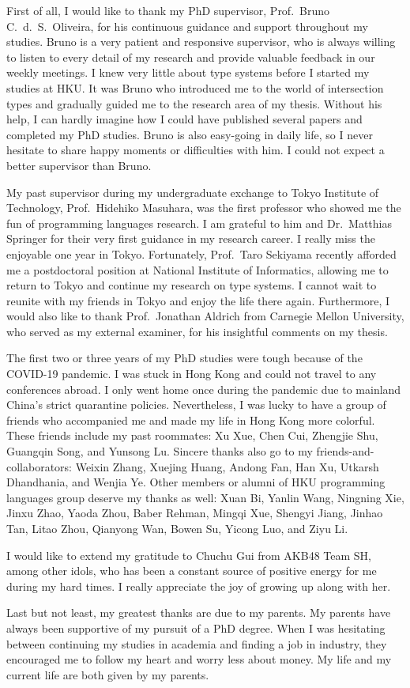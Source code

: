 First of all, I would like to thank my PhD supervisor, Prof.\ Bruno C.\ d.\ S.\
Oliveira, for his continuous guidance and support throughout my studies. Bruno
is a very patient and responsive supervisor, who is always willing to listen to
every detail of my research and provide valuable feedback in our weekly
meetings. I knew very little about type systems before I started my studies at
HKU. It was Bruno who introduced me to the world of intersection types and
gradually guided me to the research area of my thesis. Without his help, I can
hardly imagine how I could have published several papers and completed my PhD
studies. Bruno is also easy-going in daily life, so I never hesitate to share
happy moments or difficulties with him. I could not expect a better supervisor
than Bruno.

My past supervisor during my undergraduate exchange to Tokyo Institute of
Technology, Prof.\ Hidehiko Masuhara, was the first professor who showed me the
fun of programming languages research. I am grateful to him and Dr.\ Matthias
Springer for their very first guidance in my research career. I really miss the
enjoyable one year in Tokyo. Fortunately, Prof.\ Taro Sekiyama recently afforded
me a postdoctoral position at National Institute of Informatics, allowing me to
return to Tokyo and continue my research on type systems. I cannot wait to
reunite with my friends in Tokyo and enjoy the life there again. Furthermore, I
would also like to thank Prof.\ Jonathan Aldrich from Carnegie Mellon University,
who served as my external examiner, for his insightful comments on my thesis.

The first two or three years of my PhD studies were tough because of the COVID-19
pandemic. I was stuck in Hong Kong and could not travel to any conferences
abroad. I only went home once during the pandemic due to mainland China's
strict quarantine policies. Nevertheless, I was lucky to have a group of friends
who accompanied me and made my life in Hong Kong more colorful. These friends
include my past roommates: Xu Xue, Chen Cui, Zhengjie Shu, Guangqin Song, and
Yunsong Lu. Sincere thanks also go to my friends-and-collaborators: Weixin
Zhang, Xuejing Huang, Andong Fan, Han Xu, Utkarsh Dhandhania, and Wenjia Ye.
Other members or alumni of HKU programming languages group deserve my thanks as
well: Xuan Bi, Yanlin Wang, Ningning Xie, Jinxu Zhao, Yaoda Zhou, Baber Rehman,
Mingqi Xue, Shengyi Jiang, Jinhao Tan, Litao Zhou, Qianyong Wan, Bowen Su,
Yicong Luo, and Ziyu Li.

I would like to extend my gratitude to Chuchu Gui from AKB48 Team SH, among
other idols, who has been a constant source of positive energy for me during my
hard times. I really appreciate the joy of growing up along with her.

Last but not least, my greatest thanks are due to my parents. My parents have
always been supportive of my pursuit of a PhD degree. When I was hesitating
between continuing my studies in academia and finding a job in industry, they
encouraged me to follow my heart and worry less about money. My life and my
current life are both given by my parents.
